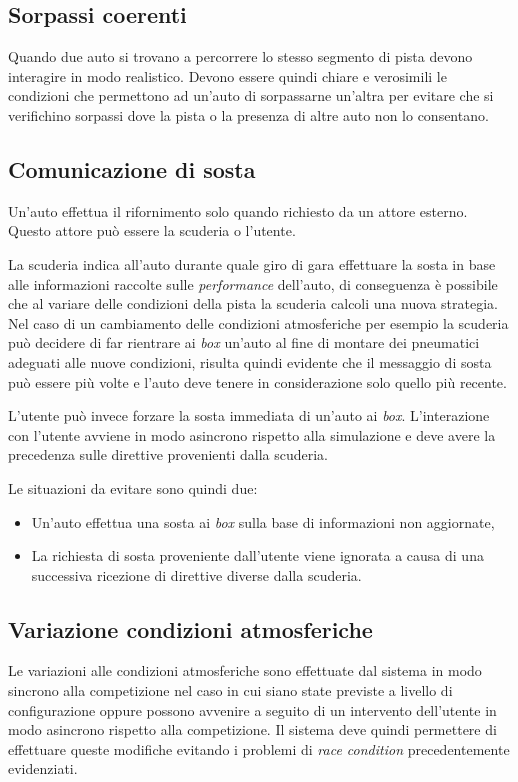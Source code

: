\documentclass[11pt,a4paper]{report}
\begin{document}
\subsection*{Sorpassi coerenti}
Quando due auto si trovano a percorrere lo stesso segmento di pista devono interagire in modo realistico. Devono essere quindi chiare e verosimili le condizioni che permettono ad un'auto di sorpassarne un'altra per evitare che si verifichino sorpassi dove la pista o la presenza di altre auto non lo consentano.

\subsection*{Comunicazione di sosta}
Un'auto effettua il rifornimento solo quando richiesto da un attore esterno. Questo attore può essere la scuderia o l'utente.

La scuderia indica all'auto durante quale giro di gara effettuare la sosta in base alle informazioni raccolte sulle \textit{performance} dell'auto, di conseguenza è possibile che al variare delle condizioni della pista la scuderia calcoli una nuova strategia. Nel caso di un cambiamento delle condizioni atmosferiche per esempio la scuderia può decidere di far rientrare ai \textit{box} un'auto al fine di montare dei pneumatici adeguati alle nuove condizioni, risulta quindi evidente che il messaggio di sosta può essere più volte e l'auto deve tenere in considerazione solo quello più recente.

L'utente può invece forzare la sosta immediata di un'auto ai \textit{box}. L'interazione con l'utente avviene in modo asincrono rispetto alla simulazione e deve avere la precedenza sulle direttive provenienti dalla scuderia.

Le situazioni da evitare sono quindi due:
\begin{itemize}
\item Un'auto effettua una sosta ai \textit{box} sulla base di informazioni non aggiornate,
\item La richiesta di sosta proveniente dall'utente viene ignorata a causa di una successiva ricezione di direttive diverse dalla scuderia.
\end{itemize}

\subsection*{Variazione condizioni atmosferiche}
Le variazioni alle condizioni atmosferiche sono effettuate dal sistema in modo sincrono alla competizione nel caso in cui siano state previste a livello di configurazione oppure possono avvenire a seguito di un intervento dell'utente in modo asincrono rispetto alla competizione. Il sistema deve quindi permettere di effettuare queste modifiche evitando i problemi di \textit{race condition} precedentemente evidenziati.
\end{document}
